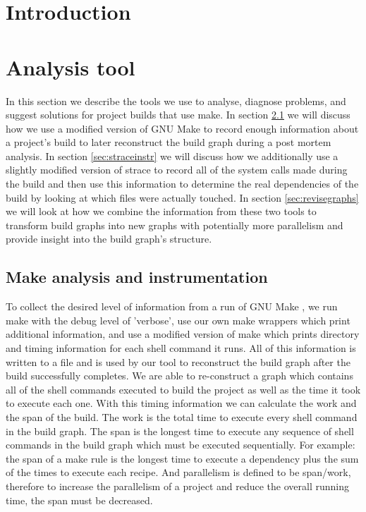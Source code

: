 \documentclass[twocolumn,acmtog,10pt,review]{acmart}
\begin{document}

\section{Introduction}

\section{Analysis tool}
\label{sec:analysis}
In this section we describe the tools we use to analyse, diagnose problems, and suggest solutions
for project builds that use make.  In section \ref{sec:makeanalysis} we will discuss how we use
a modified version of GNU Make to record enough information about a project's build to later
reconstruct the build graph during a post mortem analysis.  In section \ref{sec:straceinstr} we
will discuss how we additionally use a slightly modified version of strace to record all of the
system calls made during the build and then use this information to determine the real dependencies
of the build by looking at which files were actually touched. In section \ref{sec:revisegraphs} we
will look at how we combine the information from these two tools to transform build graphs into
new graphs with potentially more parallelism and provide insight into the build graph's structure.

\subsection{Make analysis and instrumentation}
\label{sec:makeanalysis}

To collect the desired level of information from a run of GNU Make \cite{}, we run make with the
debug level of 'verbose', use our own make wrappers which print additional information, and use
a modified version of make which prints directory and timing information for each shell command
it runs.  All of this information is written to a file and is used by our tool to reconstruct
the build graph after the build successfully completes.  We are able to re-construct a graph which
contains all of the shell commands executed to build the project as well as the time it took
to execute each one.  With this timing information we can calculate the work and the span of the
build.  The work is the total time to execute every shell command in the build graph.  The span is
the longest time to execute any sequence of shell commands in the build graph which must be
executed sequentially.  For example: the span of a make rule is the longest time to execute a
dependency plus the sum of the times to execute each recipe.  And parallelism is defined to be
span/work, therefore to increase the parallelism of a project and reduce the overall running time,
the span must be decreased.
\end{document}

